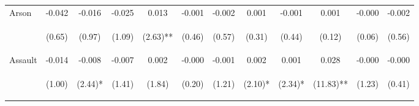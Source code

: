\begin{tabular}{lccccccccccc}
\noalign{\smallskip}Arson & -0.042 & -0.016 & -0.025 & 0.013 & -0.001 & -0.002 & 0.001 & -0.001 & 0.001 & -0.000 & -0.002\\
 & \begin{footnotesize}(0.65)\end{footnotesize} & \begin{footnotesize}(0.97)\end{footnotesize} & \begin{footnotesize}(1.09)\end{footnotesize} & \begin{footnotesize}(2.63)**\end{footnotesize} & \begin{footnotesize}(0.46)\end{footnotesize} & \begin{footnotesize}(0.57)\end{footnotesize} & \begin{footnotesize}(0.31)\end{footnotesize} & \begin{footnotesize}(0.44)\end{footnotesize} & \begin{footnotesize}(0.12)\end{footnotesize} & \begin{footnotesize}(0.06)\end{footnotesize} & \begin{footnotesize}(0.56)\end{footnotesize}\\
\noalign{\smallskip}Assault & -0.014 & -0.008 & -0.007 & 0.002 & -0.000 & -0.001 & 0.002 & 0.001 & 0.028 & -0.000 & -0.000\\
 & \begin{footnotesize}(1.00)\end{footnotesize} & \begin{footnotesize}(2.44)*\end{footnotesize} & \begin{footnotesize}(1.41)\end{footnotesize} & \begin{footnotesize}(1.84)\end{footnotesize} & \begin{footnotesize}(0.20)\end{footnotesize} & \begin{footnotesize}(1.21)\end{footnotesize} & \begin{footnotesize}(2.10)*\end{footnotesize} & \begin{footnotesize}(2.34)*\end{footnotesize} & \begin{footnotesize}(11.83)**\end{footnotesize} & \begin{footnotesize}(1.23)\end{footnotesize} & \begin{footnotesize}(0.41)\end{footnotesize}\\

\end{tabular}
